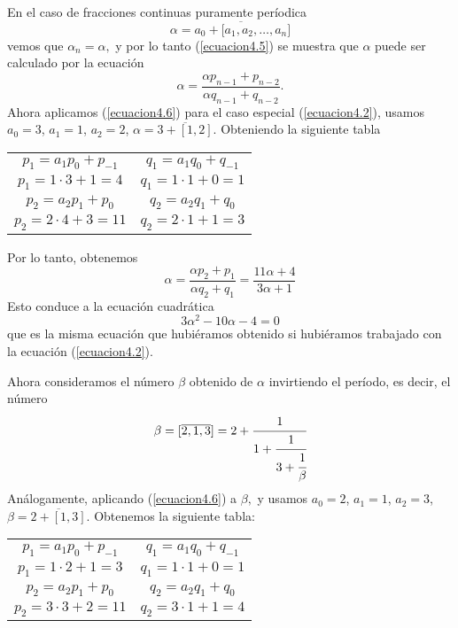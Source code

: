 \begin{ejem}
    En el caso de fracciones continuas puramente períodica
    $$
    \alpha = \overline{a_{0}+[a_{1},a_{2},\ldots,a_{n}}]
    $$
    vemos que $\alpha_{n} = \alpha,$
    y por lo tanto (\ref{ecuacion4.5}) se muestra que $\alpha$ puede ser calculado por la ecuación
    \begin{equation}
        \alpha=\frac{\alpha p_{n-1}+p_{n-2}}{\alpha q_{n-1}+q_{n-2}}.
        \label{ecuacion4.6}
    \end{equation}
    Ahora aplicamos (\ref{ecuacion4.6}) para el caso especial (\ref{ecuacion4.2}), usamos $a_{0}=3$, $a_{1}=1$, $a_{2}=2$, $\alpha=\overline{3+[1,2]}$. Obteniendo la siguiente tabla
    \begin{table}[h]
    \begin{center}
    \begin{tabular}{| c | c |}
    \hline
    $p_{1}=a_{1}p_{0}+p_{-1}$ & $q_{1}=a_{1}q_{0}+q_{-1}$ \\ 
    $p_{1}=1\cdot3+1=4$ & $q_{1}=1\cdot1+0=1$ \\\hline
    $p_{2}=a_{2}p_{1}+p_{0}$ & $q_{2}=a_{2}q_{1}+q_{0}$ \\
    $p_{2}=2\cdot4+3=11$ & $q_{2}=2\cdot1+1=3$ \\\hline
    \end{tabular}
    \label{tab:reducidas}
    \end{center}
    \end{table}
    
    Por lo tanto, obtenemos
    $$
    \alpha=\frac{\alpha p_{2}+p_{1}}{\alpha q_{2}+q_{1}}=\frac{11 \alpha+4}{3 \alpha+1}
    $$
    Esto conduce a la ecuación cuadrática
    \begin{equation}
    3 \alpha^{2}-10 \alpha-4=0 
    \label{ecuacion4.7}
    \end{equation}
    que es la misma ecuación que hubiéramos obtenido si hubiéramos trabajado con la ecuación (\ref{ecuacion4.2}).
    
    Ahora consideramos el número $\beta$ obtenido de $\alpha$ invirtiendo el período, es decir, el número
    $$
    \beta=[\overline{2,1,3}]=2+\cfrac{1}{1+\cfrac{1}{3+\cfrac{1}{\beta}}}
    $$
    Análogamente, aplicando (\ref{ecuacion4.6}) a $\beta,$ y usamos $a_{0}=2$, $a_{1}=1$, $a_{2}=3$, $\beta=\overline{2+[1,3]}$. Obtenemos la siguiente tabla:
    \begin{table}[h]
    \begin{center}
    \begin{tabular}{| c | c |}
    \hline
    $p_{1}=a_{1}p_{0}+p_{-1}$ & $q_{1}=a_{1}q_{0}+q_{-1}$ \\ 
    $p_{1}=1\cdot2+1=3$ & $q_{1}=1\cdot1+0=1$ \\\hline
    $p_{2}=a_{2}p_{1}+p_{0}$ & $q_{2}=a_{2}q_{1}+q_{0}$ \\
    $p_{2}=3\cdot3+2=11$ & $q_{2}=3\cdot1+1=4$ \\\hline
    \end{tabular}
    \label{tab:reducidas}
    \end{center}
    \end{table}
    

\end{ejem}
